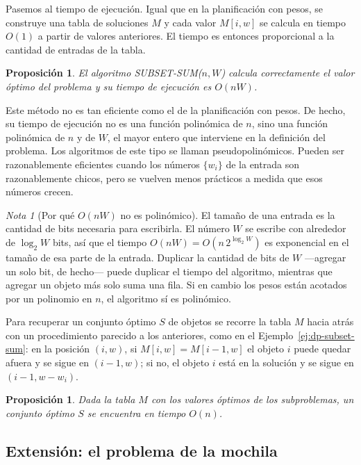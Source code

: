 \documentclass[12pt, spanish, oneside, openany]{book}
\newcommand{\alg}[1]{#1}
\theoremstyle{uprightplain}
\newtheorem{proposicion}[teorema]{Proposición}
\theoremstyle{definition}
\theoremstyle{remark}
\newtheorem{nota}[teorema]{Nota}
\theoremstyle{definition}
\begin{document}
Pasemos al tiempo de ejecución. Igual que en la planificación con pesos, se construye una tabla de soluciones $M$ y cada valor $M[i,w]$ se calcula en tiempo $O(1)$ a partir de valores anteriores. El tiempo es entonces proporcional a la cantidad de entradas de la tabla.

\begin{proposicion}
\label{prop:dp-subset-sum-tiempo}
El algoritmo \alg{SUBSET-SUM}($n,W$) calcula correctamente el valor óptimo del problema y su tiempo de ejecución es $O(nW)$.
\end{proposicion}

Este método no es tan eficiente como el de la planificación con pesos. De hecho, su tiempo de ejecución no es una función polinómica de $n$, sino una función polinómica de $n$ y de $W$, el mayor entero que interviene en la definición del problema. Los algoritmos de este tipo se llaman pseudopolinómicos. Pueden ser razonablemente eficientes cuando los números $\{w_i\}$ de la entrada son razonablemente chicos, pero se vuelven menos prácticos a medida que esos números crecen.

\begin{nota}[Por qué $O(nW)$ no es polinómico]
\label{nota:dp-pseudopolinomico}
El tamaño de una entrada es la cantidad de bits necesaria para escribirla. El número $W$ se escribe con alrededor de $\log_2 W$ bits, así que el tiempo $O(nW)=O(n\,2^{\log_2 W})$ es exponencial en el tamaño de esa parte de la entrada. Duplicar la cantidad de bits de $W$ ---agregar un solo bit, de hecho--- puede duplicar el tiempo del algoritmo, mientras que agregar un objeto más solo suma una fila. Si en cambio los pesos están acotados por un polinomio en $n$, el algoritmo sí es polinómico.
\end{nota}

Para recuperar un conjunto óptimo $S$ de objetos se recorre la tabla $M$ hacia atrás con un procedimiento parecido a los anteriores, como en el Ejemplo~\ref{ej:dp-subset-sum}: en la posición $(i,w)$, si $M[i,w]=M[i-1,w]$ el objeto $i$ puede quedar afuera y se sigue en $(i-1,w)$; si no, el objeto $i$ está en la solución y se sigue en $(i-1,w-w_i)$.

\begin{proposicion}
\label{prop:dp-subset-sum-solucion}
Dada la tabla $M$ con los valores óptimos de los subproblemas, un conjunto óptimo $S$ se encuentra en tiempo $O(n)$.
\end{proposicion}

\subsection{Extensión: el problema de la mochila}
\end{document}
